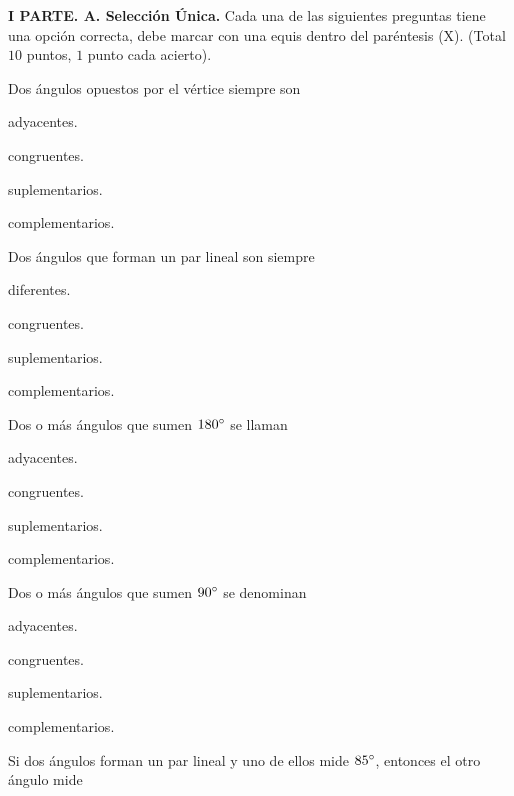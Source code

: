 \documentclass[12pt, fleqn]{article}
\begin{document}
\setcounter{page}{2} 

\vspace{-1.5cm}


\sf

{\bf I PARTE. A. Selección Única.} Cada una de las siguientes preguntas tiene una opción correcta, debe marcar con una equis dentro del paréntesis (X). (Total $10$ puntos, $1$ punto cada acierto).

\benu
\item Dos ángulos opuestos por el vértice siempre son
\vp

\benu
\item[] \opc adyacentes. \vf
\item[] \opc congruentes. \vf
\item[] \opc suplementarios.\vf
\item[] \opc complementarios.
\eenu
\vs

\item Dos ángulos que forman un par lineal son siempre
\vp

\benu
\item[] \opc diferentes. \vf
\item[] \opc congruentes. \vf
\item[] \opc suplementarios.\vf
\item[] \opc complementarios.
\eenu
\vs

\item Dos o más ángulos que sumen $180^\circ$ se llaman
\vp

\benu
\item[] \opc adyacentes. \vf
\item[] \opc congruentes. \vf
\item[] \opc suplementarios.\vf
\item[] \opc complementarios.
\eenu
\vs

\item Dos o más ángulos que sumen $90^\circ$ se denominan
\vp

\benu
\item[] \opc adyacentes. \vf
\item[] \opc congruentes. \vf
\item[] \opc suplementarios.\vf
\item[] \opc complementarios.
\eenu
\vs

\pagebreak

\item Si dos ángulos forman un par lineal y uno de ellos mide $85^\circ$, entonces el otro ángulo mide \vspace{2mm}
\vp
\end{document}
